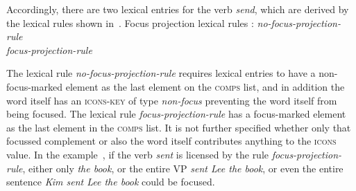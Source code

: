 \documentclass[output=paper
 	        ,biblatex
                ,babelshorthands
                ,newtxmath
                ,draftmode
                ,colorlinks, citecolor=brown
]{langscibook}
\begin{document}
Accordingly, there are two lexical entries for the verb \textit{send},
which are derived by the lexical rules shown
in~.
\ea
\label{ex:song-focus-projection}
Focus projection lexical rules \citep[227]{song2018}:
\ea
\emph{no-focus-projection-rule} \impl \\
\ex
\emph{focus-projection-rule} \impl \\
\z
\z

The lexical rule \textit{no-focus-projection-rule} requires lexical
entries to have a non-focus-marked element as the last element on the
\textsc{comps} list, and in addition the word itself has an
\textsc{icons-key} of type \textit{non-focus} preventing the word
itself from being focused. The lexical rule \textit{focus-projection-rule}
has a focus-marked element as the last element in the \textsc{comps}
list. It is not further specified whether only that focussed
complement or also the word itself contributes anything to the
\textsc{icons} value. In the example~,
if the verb \textit{sent} is licensed by the rule
\textit{focus-projection-rule}, either only \textit{the book},
or the entire VP \textit{sent Lee the book}, or even the
entire sentence \textit{Kim sent Lee the book} could be focused.
\end{document}
